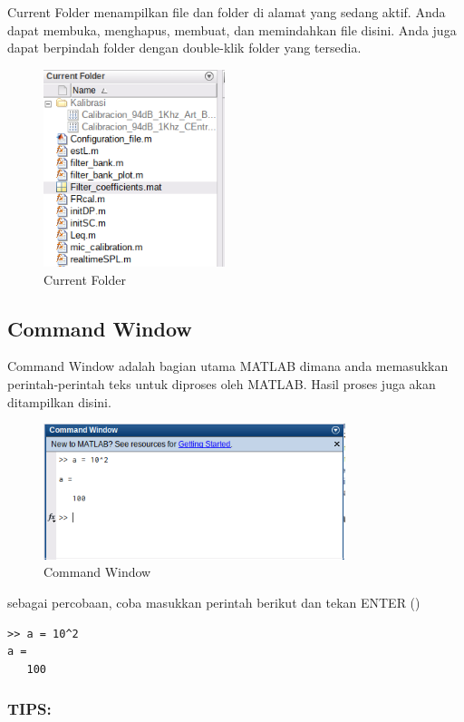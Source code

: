 \documentclass[12pt]{book}
\begin{document}
	Current Folder menampilkan file dan folder di alamat yang sedang aktif.
	Anda dapat membuka, menghapus, membuat, dan memindahkan file disini.
	Anda juga dapat berpindah folder dengan double-klik folder yang tersedia.
	
	\begin{figure}[!ht]
		\centering
		\includegraphics[width=150pt]{images/currentfolder}
		\caption{Current Folder}
	\end{figure}

	\subsection{Command Window}
	
	Command Window adalah bagian utama MATLAB dimana anda memasukkan perintah-perintah teks untuk diproses oleh MATLAB.
	Hasil proses juga akan ditampilkan disini.
	
	\begin{figure}[!ht]
		\centering
		\includegraphics[width=250pt]{images/commandwindow}
		\caption{Command Window}
	\end{figure}

	sebagai percobaan, coba masukkan perintah berikut dan tekan ENTER (\keys{\return})
	
	\begin{verbatim}
>> a = 10^2
a = 
   100
	\end{verbatim}
	
	\subsubsection{TIPS:}
	
\end{document}
